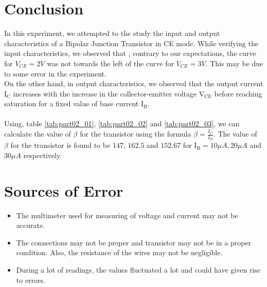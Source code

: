 \documentclass[12pt]{article}
\begin{document}
\section{Conclusion}
In this experiment, we attempted to the study the input and output characteristics of a Bipolar Junction Transistor in CE mode. While verifying the input characteristics, we observed that , contrary to our expectations, the curve for $V_{CE}=2V$ was not towards the left of the curve for $V_{CE}=3V$. This may be due to some error in the experiment. \\
On the other hand, in output characteristics, we observed that the output current $\mathrm{I_C}$ increases with the increase in the collector-emitter voltage $\mathrm{V_{CE}}$ before reaching saturation for a fixed value of base current $\mathrm{I_B}$.\\
\\
Using, table \ref{tab:part02_01}, \ref{tab:part02_02} and \ref{tab:part02_03}, we can calculate the value of $\beta$ for the transistor using the formula $\beta = \frac{I_C}{I_B}$.
The value of $\beta$ for the transistor is found to be $147$, $162.5$ and $152.67$ for $\mathrm{I_B}=10 \mu A,20 \mu A$ and $30 \mu A$ respectively.
\section{Sources of Error}
\begin{itemize}
    \item The multimeter used for measuring of voltage and current may not be accurate.
    \item The connections may not be proper and transistor may not be in a proper condition. Also, the resistance of the wires may not be negligible.
    \item During a lot of readings, the values fluctuated a lot and could have given rise to errors.
\end{itemize}

 
\end{document}

